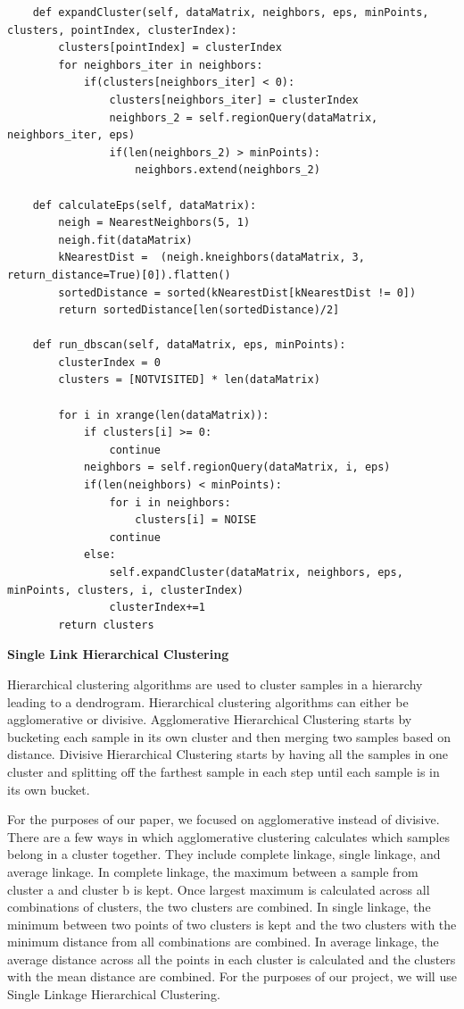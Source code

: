 \documentclass[12pt]{article}
\begin{document}
\begin{enumerate}
\begin{verbatim}
    def expandCluster(self, dataMatrix, neighbors, eps, minPoints, clusters, pointIndex, clusterIndex):
        clusters[pointIndex] = clusterIndex
        for neighbors_iter in neighbors:
            if(clusters[neighbors_iter] < 0):
                clusters[neighbors_iter] = clusterIndex
                neighbors_2 = self.regionQuery(dataMatrix, neighbors_iter, eps)
                if(len(neighbors_2) > minPoints):
                    neighbors.extend(neighbors_2)

    def calculateEps(self, dataMatrix):
        neigh = NearestNeighbors(5, 1)
        neigh.fit(dataMatrix)
        kNearestDist =  (neigh.kneighbors(dataMatrix, 3, return_distance=True)[0]).flatten()
        sortedDistance = sorted(kNearestDist[kNearestDist != 0])
        return sortedDistance[len(sortedDistance)/2]

    def run_dbscan(self, dataMatrix, eps, minPoints):
        clusterIndex = 0
        clusters = [NOTVISITED] * len(dataMatrix)

        for i in xrange(len(dataMatrix)):
            if clusters[i] >= 0:
                continue
            neighbors = self.regionQuery(dataMatrix, i, eps)
            if(len(neighbors) < minPoints):
                for i in neighbors:
                    clusters[i] = NOISE
                continue
            else:
                self.expandCluster(dataMatrix, neighbors, eps, minPoints, clusters, i, clusterIndex)
                clusterIndex+=1
        return clusters

\end{verbatim}

\textbf{Single Link Hierarchical Clustering}

Hierarchical clustering algorithms are used to cluster samples in a hierarchy leading to a dendrogram. Hierarchical clustering algorithms can either be agglomerative or divisive. Agglomerative Hierarchical Clustering starts by bucketing each sample in its own cluster and then merging two samples based on distance. Divisive Hierarchical Clustering starts by having all the samples in one cluster and splitting off the farthest sample in each step until each sample is in its own bucket.

For the purposes of our paper, we focused on agglomerative instead of divisive.  There are a few ways in which agglomerative clustering calculates which samples belong in a cluster together. They include complete linkage, single linkage, and average linkage. In complete linkage, the maximum between a sample from cluster a and cluster b is kept. Once largest maximum is calculated across all combinations of clusters, the two clusters are combined. In single linkage, the minimum between two points of two clusters is kept and the two clusters with the minimum distance from all combinations are combined. In average linkage, the average distance across all the points in each cluster is calculated and the clusters with the mean distance are combined. For the purposes of our project, we will use Single Linkage Hierarchical Clustering.


\end{enumerate}
\end{document}
